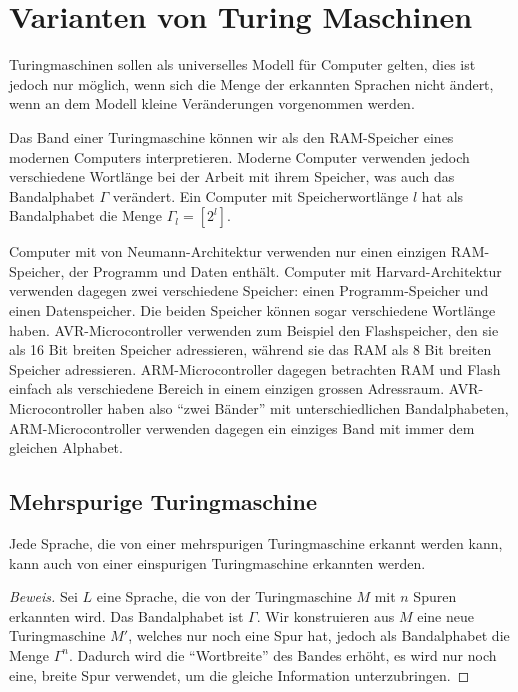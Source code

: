 %
%
%
\section{Varianten von Turing Maschinen}
Turingmaschinen sollen als universelles Modell für Computer gelten,
dies ist jedoch nur möglich, wenn sich die Menge der erkannten Sprachen
nicht ändert, wenn an dem Modell kleine Veränderungen vorgenommen
werden.

Das Band einer Turingmaschine können wir als den RAM-Speicher
eines modernen Computers interpretieren. Moderne Computer verwenden
jedoch verschiedene Wortlänge bei der Arbeit mit ihrem Speicher,
was auch das Bandalphabet $\Gamma$ verändert. Ein Computer mit
Speicherwortlänge $l$ hat als Bandalphabet die Menge $\Gamma_l=[2^l]$.

%
%
Computer mit von Neumann-Architektur verwenden nur einen einzigen RAM-Speicher,
der Programm und Daten enthält. Computer mit Harvard-Architektur
verwenden dagegen zwei verschiedene Speicher: einen Programm-Speicher
und einen Datenspeicher. Die beiden Speicher können sogar verschiedene
Wortlänge haben. AVR-Microcontroller verwenden zum Beispiel
den Flashspeicher, den sie als 16 Bit breiten Speicher adressieren,
während sie das RAM als 8 Bit breiten Speicher adressieren.
ARM-Microcontroller dagegen betrachten RAM und Flash einfach als
verschiedene Bereich in einem einzigen grossen Adressraum.
AVR-Microcontroller haben also ``zwei Bänder'' mit unterschiedlichen
Bandalphabeten, ARM-Microcontroller verwenden dagegen ein einziges Band
mit immer dem gleichen Alphabet.

\subsection{Mehrspurige Turingmaschine}
%
\begin{satz}\label{mehrspurigeturingmaschine}
Jede Sprache, die von einer mehrspurigen Turingmaschine
erkannt werden kann, kann auch von einer einspurigen Turingmaschine
erkannten werden.
\end{satz}

\begin{proof}[Beweis]
Sei $L$ eine Sprache, die von der Turingmaschine $M$ mit $n$ Spuren
erkannten wird. Das Bandalphabet ist $\Gamma$. Wir konstruieren aus
$M$ eine neue Turingmaschine $M'$, welches nur noch eine Spur hat,
jedoch als Bandalphabet die Menge $\Gamma^n$. Dadurch wird die ``Wortbreite''
des Bandes erhöht, es wird nur noch eine, breite Spur verwendet, um die
gleiche Information unterzubringen.
\end{proof}

